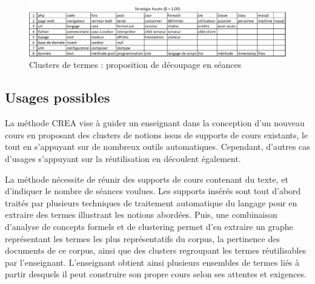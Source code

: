 \begin{figure}[htb!]
\centering
\centerline{  %
\includegraphics[scale=0.65]{4-Experiences/images/cas-1/clusters-S=H-B=1.00.png}
}
\caption{Clusters de termes : proposition de découpage en séances}
\label{figure:5-ClustersStrategieHauteBeta1}
\end{figure}

\vfill
\hspace{0pt}




\clearpage %
\newpage   %


\subsection{Usages possibles}
\label{subsection:Conclusion:Synthese:Usages}

La méthode CREA vise à guider un enseignant dans la conception d'un nouveau cours en proposant des clusters de notions issus de supports de cours existants, le tout en s'appuyant sur de nombreux outils automatiques.
Cependant, d'autres cas d'usages s'appuyant sur la réutilisation en découlent également.

\bigskip

La méthode nécessite de réunir des supports de cours contenant du texte, et d'indiquer le nombre de séances voulues.
Les supports insérés sont tout d'abord traités par plusieurs techniques de traitement automatique du langage pour en extraire des termes illustrant les notions abordées.
Puis, une combinaison d'analyse de concepts formels et de clustering permet d'en extraire un graphe représentant les termes les plus représentatifs du corpus, la pertinence des documents de ce corpus, ainsi que des clusters regroupant les termes réutilisables par l'enseignant.
L'enseignant obtient ainsi plusieurs ensembles de termes liés à partir desquels il peut construire son propre cours selon ses attentes et exigences.

